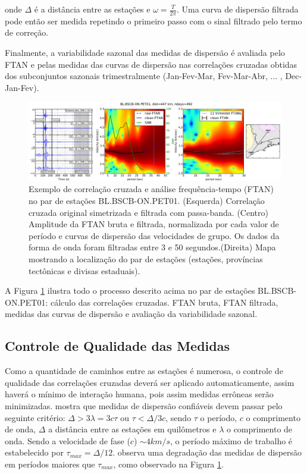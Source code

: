 onde $\Delta$ é a distância entre as estações e $\omega = \frac{T}{2\pi}$. Uma curva de dispersão filtrada pode então ser medida repetindo o primeiro passo com o sinal filtrado pelo termo de correção.

Finalmente, a variabilidade sazonal das medidas de dispersão é avaliada pelo FTAN e pelas medidas das curvas de dispersão nas correlações cruzadas obtidas dos subconjuntos sazonais trimestralmente (Jan-Fev-Mar, Fev-Mar-Abr, ... , Dec-Jan-Fev). 

\begin{figure}[!ht]
\centering
\includegraphics[scale=0.3]{Figs/correlacao_FTAN.png}
\caption[Exemplo de correlação cruzada e análise frequência-tempo (FTAN) no par de estações BL.BSCB-ON.PET01.]{Exemplo de correlação cruzada e análise frequência-tempo (FTAN) no par de estações BL.BSCB-ON.PET01. (Esquerda) Correlação cruzada original simetrizada e filtrada com passa-banda. (Centro) Amplitude da FTAN bruta e filtrada, normalizada por cada valor de período e curvas de dispersão das velocidades de grupo. Os dados da forma de onda foram filtradas entre 3 e 50 segundos.(Direita) Mapa mostrando a localização do par de estações (estações, províncias tectônicas e divisas estaduais).}
\label{correlacao_FTAN}
\end{figure}

A Figura \ref{correlacao_FTAN} ilustra todo o processo descrito acima no par de estações BL.BSCB-ON.PET01: cálculo das correlações cruzadas. FTAN bruta, FTAN filtrada, medidas das curvas de dispersão e avaliação da variabilidade sazonal. 

\subsection{Controle de Qualidade das Medidas}

Como a quantidade de caminhos entre as estações é numerosa, o controle de qualidade das correlações cruzadas deverá ser aplicado automaticamente, assim haverá o mínimo de interação humana, pois assim medidas errôneas serão minimizadas. \cite{bensen_processing_2007} mostra que medidas de dispersão confiáveis devem passar pelo seguinte critério: $\Delta > 3\lambda = 3c\tau$ ou $\tau < \Delta/3c$, sendo $\tau$ o período, $c$ o comprimento de onda, $\Delta$ a distância entre as estações em quilômetros e $\lambda$ o comprimento de onda. Sendo a velocidade de fase ($c$) $\sim 4 km/s$, o período máximo de trabalho é estabelecido por $\tau_{max} = \Delta/12$. \cite{bensen_processing_2007} observa uma degradação das medidas de dispersão em períodos maiores que $\tau_{max}$, como observado na Figura \ref{correlacao_FTAN}. 

